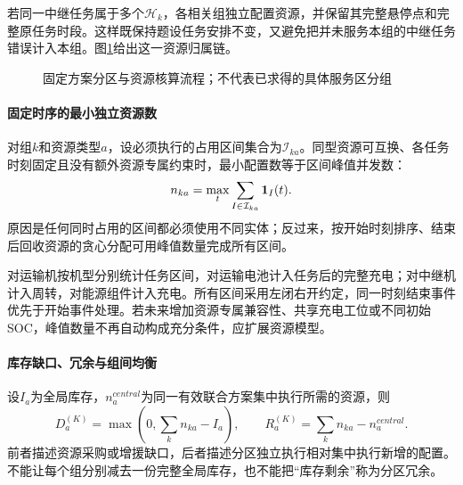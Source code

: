 若同一中继任务属于多个$\mathcal H_k$，各相关组独立配置资源，并保留其完整悬停点和完整原任务时段。这样既保持题设任务安排不变，又避免把并未服务本组的中继任务错误计入本组。图\ref{fig:q4-flow}给出这一资源归属链。
\begin{figure}[htbp]\centering
{}
\caption{固定方案分区与资源核算流程；不代表已求得的具体服务区分组}\label{fig:q4-flow}
\end{figure}

\paragraph{固定时序的最小独立资源数}
对组$k$和资源类型$a$，设必须执行的占用区间集合为$\mathcal I_{ka}$。同型资源可互换、各任务时刻固定且没有额外资源专属约束时，最小配置数等于区间峰值并发数：
\begin{equation}n_{ka}=\max_t\sum_{I\in\mathcal I_{ka}}\mathbf{1}_I(t).\label{eq:peak}\end{equation}
原因是任何同时占用的区间都必须使用不同实体；反过来，按开始时刻排序、结束后回收资源的贪心分配可用峰值数量完成所有区间。

对运输机按机型分别统计任务区间，对运输电池计入任务后的完整充电；对中继机计入周转，对能源组件计入充电。所有区间采用左闭右开约定，同一时刻结束事件优先于开始事件处理。若未来增加资源专属兼容性、共享充电工位或不同初始SOC，峰值数量不再自动构成充分条件，应扩展资源模型。

\paragraph{库存缺口、冗余与组间均衡}
设$I_a$为全局库存，$n_a^{central}$为同一有效联合方案集中执行所需的资源，则
\begin{equation}
D_a^{(K)}=\max\left(0,\sum_kn_{ka}-I_a\right),\qquad
R_a^{(K)}=\sum_kn_{ka}-n_a^{central}.\label{eq:shortage}
\end{equation}
前者描述资源采购或增援缺口，后者描述分区独立执行相对集中执行新增的配置。不能让每个组分别减去一份完整全局库存，也不能把“库存剩余”称为分区冗余。

